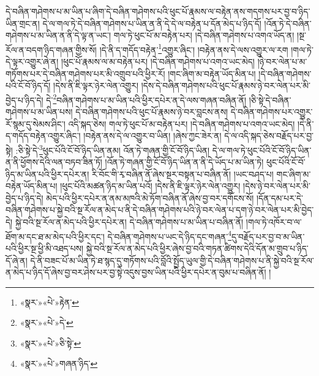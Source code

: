 དེ་བཞིན་གཤེགས་པ་མ་ཡིན་པ་ཞིག་དེ་བཞིན་གཤེགས་པའི་ཕུང་པོ་རྣམས་ལ་བརྟེན་ནས་གདགས་པར་བྱ་བ་ཉིད་ཡིན་གྲང་ན། དེ་ལ་གལ་ཏེ་དེ་བཞིན་གཤེགས་པ་ཡིན་ན་ནི་དེ་དེ་ལ་བརྟེན་པ་དོན་མེད་པ་ཉིད་དོ། །འོན་ཏེ་དེ་བཞིན་གཤེགས་པ་མ་ཡིན་ན་ནི་དེ་ལྟ་ན་ཡང་། གལ་ཏེ་ཕུང་པོ་མ་བརྟེན་པར། །དེ་བཞིན་གཤེགས་པ་འགའ་ཡོད་ན། །སྔ་རོལ་ན་བདག་ཉིད་གཞན་གྱིས་སོ། །དེ་ནི་ད་གདོད་བརྟེན་\footnote{«སྣར་»«པེ་»རྟེན་}འགྱུར་ཞིང་། །བརྟེན་ནས་དེ་ལས་འགྱུར་ལ་རག །གལ་ཏེ་དེ་ལྟར་འགྱུར་ཞེ་ན། །ཕུང་པོ་རྣམས་ལ་མ་བརྟེན་པར། །དེ་བཞིན་གཤེགས་པ་འགའ་ཡང་མེད། །ཉེ་བར་ལེན་པ་མ་གཏོགས་པར་དེ་བཞིན་གཤེགས་པར་མི་འགྲུབ་པའི་ཕྱིར་རོ། །གང་ཞིག་མ་བརྟེན་ཡོད་མིན་པ། །དེ་བཞིན་གཤེགས་པའི་ངོ་བོ་ཉིད་དོ། །དེས་ནི་ཇི་ལྟར་ཉེར་ལེན་འགྱུར། །དེས་དེ་བཞིན་གཤེགས་པའི་ཕུང་པོ་རྣམས་ཉེ་བར་ལེན་པར་མི་བྱེད་པ་ཉིད་དེ། དེ་\footnote{«སྣར་»«པེ་»དེ་}བཞིན་གཤེགས་པ་མ་ཡིན་པའི་ཕྱིར་དཔེར་ན་དེ་ལས་གཞན་བཞིན་ནོ། །ཅི་སྟེ་དེ་བཞིན་གཤེགས་པ་མ་ཡིན་པས། དེ་བཞིན་གཤེགས་པའི་ཕུང་པོ་རྣམས་ཉེ་བར་བླངས་ནས། དེ་བཞིན་གཤེགས་པར་འགྱུར་རོ་སྙམ་དུ་སེམས་ཤིང་། འདི་སྐད་ཅེས། གལ་ཏེ་ཕུང་པོ་མ་བརྟེན་པར། །དེ་བཞིན་གཤེགས་པ་འགའ་ཡང་མེད། །དེ་ནི་ད་གདོད་བརྟེན་འགྱུར་ཞིང་། །བརྟེན་ནས་དེ་ལ་འགྱུར་བ་ཡིན། །ཞེས་ཀྱང་ཟེར་ན། དེ་ལ་འདི་སྐད་ཅེས་བརྗོད་པར་བྱ་སྟེ། :ཅི་སྟེ་དེ་\footnote{«སྣར་»«པེ་»ཅི་སྟེ་}ཕུང་པོའི་ངོ་བོ་ཉིད་ཡིན་ནམ། འོན་ཏེ་གཞན་གྱི་ངོ་བོ་ཉིད་ཡིན། དེ་ལ་གལ་ཏེ་ཕུང་པོའི་ངོ་བོ་ཉིད་ཡིན་ན་ནི་ཕྱོགས་དེའི་ལན་བཏབ་ཟིན་ཏོ། །འོན་ཏེ་གཞན་གྱི་ངོ་བོ་ཉིད་ཡིན་ན་ནི་དེ་ཡོད་པ་མ་ཡིན་ཏེ། ཕུང་པོའི་ངོ་བོ་ཉིད་མ་ཡིན་པའི་ཕྱིར་དཔེར་ན། རི་བོང་གི་རྭ་བཞིན་ནོ་ཞེས་སྔར་བསྟན་པ་བཞིན་ནོ། །ཡང་བཤད་པ། གང་ཞིག་མ་བརྟེན་ཡོད་མིན་པ། །ཕུང་པོའི་མཚན་ཉིད་མ་ཡིན་པའོ། །དེས་ནི་ཇི་ལྟར་ཉེར་ལེན་འགྱུར། །དེས་ཉེ་བར་ལེན་པར་མི་བྱེད་པ་ཉིད་དེ། མེད་པའི་ཕྱིར་དཔེར་ན་ནམ་མཁའི་མེ་ཏོག་བཞིན་ནོ་ཞེས་བྱ་བར་དགོངས་སོ། །དོན་དམ་པར་དེ་བཞིན་གཤེགས་པ་སྐྱེ་བའི་སྔ་རོལ་ན་མེད་པ་ནི་དེ་བཞིན་གཤེགས་པའི་ཉེ་བར་ལེན་པ་དག་ཉེ་བར་ལེན་པར་མི་བྱེད་དེ། སྐྱེ་བའི་སྔ་རོལ་ན་མེད་པའི་ཕྱིར་དཔེར་ན། དེ་བཞིན་གཤེགས་པ་མ་ཡིན་པ་བཞིན་ནོ། །གལ་ཏེ་འཁོར་བ་ལ་ཐོག་མ་དང་ཐ་མ་མེད་པའི་ཕྱིར་དང་། དེ་བཞིན་གཤེགས་པ་ཡང་དེ་ཉིད་དང་གཞན་\footnote{«སྣར་»«པེ་»གཞན་ཉིད་}དུ་བརྗོད་པར་བྱ་བ་མ་ཡིན་པའི་ཕྱིར་སྔ་ཕྱི་མི་འཐད་པས། སྐྱེ་བའི་སྔ་རོལ་ན་མེད་པའི་ཕྱིར་ཞེས་བྱ་བའི་གཏན་ཚིགས་དེའི་དོན་མ་གྲུབ་པ་ཉིད་དོ་ཞེ་ན། དེ་ནི་བཟང་པོ་མ་ཡིན་ཏེ་ཐ་སྙད་དུ་གཏོགས་པའི་བློའི་སྤྱོད་ཡུལ་གྱི་དེ་བཞིན་གཤེགས་པ་ནི་སྐྱེ་བའི་སྔ་རོལ་ན་མེད་པ་ཉིད་དོ་ཞེས་བྱ་བར་ཤེས་པར་བྱ་སྟེ་འདུས་བྱས་ཡིན་པའི་ཕྱིར་དཔེར་ན་བུམ་པ་བཞིན་ནོ། །

